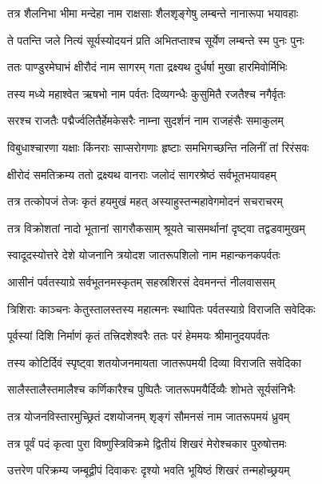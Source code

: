 \twolineshloka
{तत्र शैलनिभा भीमा मन्देहा नाम राक्षसाः}
{शैलशृङ्गेषु लम्बन्ते नानारूपा भयावहाः} %

\twolineshloka
{ते पतन्ति जले नित्यं सूर्यस्योदयनं प्रति}
{अभितप्ताश्च सूर्येण लम्बन्ते स्म पुनः पुनः} %

\twolineshloka
{ततः पाण्डुरमेघाभं क्षीरौदं नाम सागरम्}
{गता द्रक्ष्यथ दुर्धर्षा मुखा हारमिवोर्मिभिः} %

\twolineshloka
{तस्य मध्ये महाश्वेत ऋषभो नाम पर्वतः}
{दिव्यगन्धैः कुसुमितै रजतैश्च नगैर्वृतः} %

\twolineshloka
{सरश्च राजतैः पद्मैर्ज्वलितैर्हेमकेसरैः}
{नाम्ना सुदर्शनं नाम राजहंसैः समाकुलम्} %

\twolineshloka
{विबुधाश्चारणा यक्षाः किंनराः साप्सरोगणाः}
{हृष्टाः समभिगच्छन्ति नलिनीं तां रिरंसवः} %

\twolineshloka
{क्षीरोदं समतिक्रम्य ततो द्रक्ष्यथ वानराः}
{जलोदं सागरश्रेष्ठं सर्वभूतभयावहम्} %

\twolineshloka
{तत्र तत्कोपजं तेजः कृतं हयमुखं महत्}
{अस्याहुस्तन्महावेगमोदनं सचराचरम्} %

\twolineshloka
{तत्र विक्रोशतां नादो भूतानां सागरौकसाम्}
{श्रूयते चासमर्थानां दृष्ट्वा तद्वडवामुखम्} %

\twolineshloka
{स्वादूदस्योत्तरे देशे योजनानि त्रयोदश}
{जातरूपशिलो नाम महान्कनकपर्वतः} %

\twolineshloka
{आसीनं पर्वतस्याग्रे सर्वभूतनमस्कृतम्}
{सहस्रशिरसं देवमनन्तं नीलवाससम्} %

\twolineshloka
{त्रिशिराः काञ्चनः केतुस्तालस्तस्य महात्मनः}
{स्थापितः पर्वतस्याग्रे विराजति सवेदिकः} %

\twolineshloka
{पूर्वस्यां दिशि निर्माणं कृतं तत्त्रिदशेश्वरैः}
{ततः परं हेममयः श्रीमानुदयपर्वतः} %

\twolineshloka
{तस्य कोटिर्दिवं स्पृष्ट्वा शतयोजनमायता}
{जातरूपमयी दिव्या विराजति सवेदिका} %

\twolineshloka
{सालैस्तालैस्तमालैश्च कर्णिकारैश्च पुष्पितैः}
{जातरूपमयैर्दिव्यैः शोभते सूर्यसंनिभैः} %

\twolineshloka
{तत्र योजनविस्तारमुच्छ्रितं दशयोजनम्}
{शृङ्गं सौमनसं नाम जातरूपमयं ध्रुवम्} %

\twolineshloka
{तत्र पूर्वं पदं कृत्वा पुरा विष्णुस्त्रिविक्रमे}
{द्वितीयं शिखरं मेरोश्चकार पुरुषोत्तमः} %

\twolineshloka
{उत्तरेण परिक्रम्य जम्बूद्वीपं दिवाकरः}
{दृश्यो भवति भूयिष्ठं शिखरं तन्महोच्छ्रयम्} %

